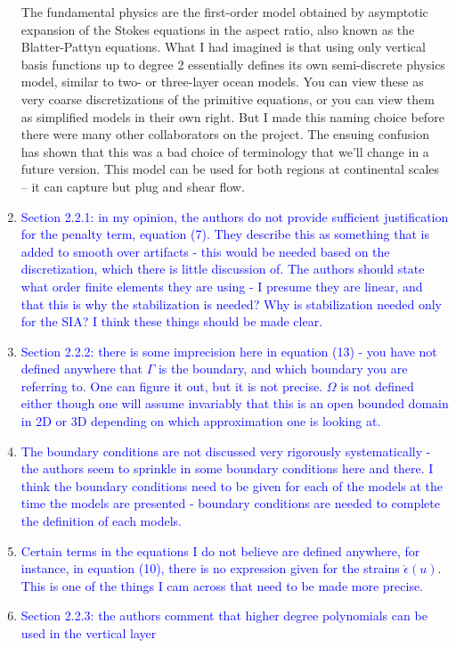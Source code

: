 \documentclass{article}
\theoremstyle{definition}
\theoremstyle{plain}
\begin{document}
\begin{enumerate}
The fundamental physics are the first-order model obtained by asymptotic expansion of the Stokes equations in the aspect ratio, also known as the Blatter-Pattyn equations.
What I had imagined is that using only vertical basis functions up to degree 2 essentially defines its own semi-discrete physics model, similar to two- or three-layer ocean models.
You can view these as very coarse discretizations of the primitive equations, or you can view them as simplified models in their own right.
But I made this naming choice before there were many other collaborators on the project.
The ensuing confusion has shown that this was a bad choice of terminology that we'll change in a future version.
This model can be used for both regions at continental scales -- it can capture but plug and shear flow.

\item \textcolor{blue}{Section 2.2.1: in my opinion, the authors do not provide sufficient justification for the penalty term,
equation (7). They describe this as something that is added to smooth over artifacts - this would be
needed based on the discretization, which there is little discussion of. The authors should state what
order finite elements they are using - I presume they are linear, and that this is why the stabilization
is needed? Why is stabilization needed only for the SIA? I think these things should be made clear.}
\item \textcolor{blue}{Section 2.2.2: there is some imprecision here in equation (13) - you have not defined anywhere that $\Gamma$
is the boundary, and which boundary you are referring to. One can figure it out, but it is not precise.
$\Omega$ is not defined either though one will assume invariably that this is an open bounded domain in 2D
or 3D depending on which approximation one is looking at.}
\item \textcolor{blue}{The boundary conditions are not discussed very rigorously systematically - the authors seem to
sprinkle in some boundary conditions here and there. I think the boundary conditions need to be
given for each of the models at the time the models are presented - boundary conditions are needed
to complete the definition of each models.}
\item \textcolor{blue}{Certain terms in the equations I do not believe are defined anywhere, for instance, in equation (10),
there is no expression given for the strains $\dot\epsilon(u)$.
This is one of the things I cam across that need to
be made more precise.}
\item \textcolor{blue}{Section 2.2.3: the authors comment that higher degree polynomials can be used in the vertical layer
}
\end{enumerate}
\end{document}
